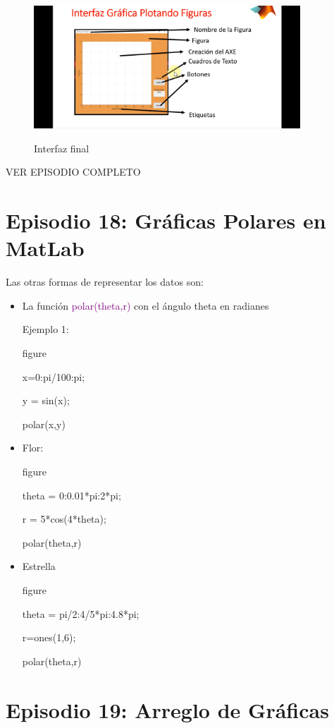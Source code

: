 \documentclass{article}
\begin{document}
\begin{itemize}
	\begin{figure}[h!]
		\centering
		\includegraphics[width = 100mm]{imagenes/Funciones/8}
		\label{final}
		\caption{Interfaz final}
	\end{figure}
	
	VER EPISODIO COMPLETO 

	
	\section{Episodio 18: Gráficas Polares en MatLab}
	
	Las otras formas de representar los datos son:
	
	\begin{itemize}
		\item La función \textcolor{purple}{polar(theta,r)} con el ángulo theta en radianes
		
		Ejemplo 1:
		
		figure
		
		x=0:pi/100:pi;
		
		y = sin(x);
		
		polar(x,y)
		
		\item Flor:
				
		figure
		
		theta = 0:0.01*pi:2*pi;
		
		r = 5*cos(4*theta);
		
		polar(theta,r)
		
		\item Estrella
				
		figure
		
		theta = pi/2:4/5*pi:4.8*pi;
		
		r=ones(1,6);
		
		polar(theta,r)
	\end{itemize}
	
	
	\end{itemize}


	\section{Episodio 19: Arreglo de Gráficas}
	
\end{document}
